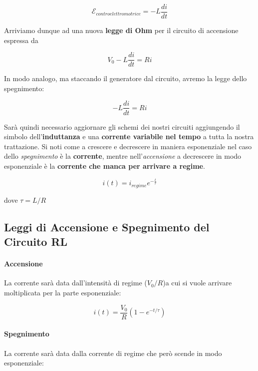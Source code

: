 $$ 
\mathcal{E}_{contro elettromotrice} = - L \frac{di}{dt}
$$

Arriviamo dunque ad una nuova \textbf{legge di Ohm} per il circuito di accensione espressa da
\begin{large}
	\begin{equation} \label{eq_Ohm_accensione}
		V_0 - L\frac{di}{dt} = Ri
	\end{equation}
\end{large}

In modo analogo, ma staccando il generatore dal circuito, avremo la legge dello spegnimento: 

\begin{large}
	\begin{equation} \label{eq_Ohm_spegnimento}
		-L\frac{di}{dt} = Ri
	\end{equation}
\end{large}

Sarà quindi necessario aggiornare gli schemi dei nostri circuiti aggiungendo il simbolo dell'\textbf{induttanza} e una \textbf{corrente variabile nel tempo} a tutta la nostra trattazione. Si noti come a crescere e decrescere in maniera esponenziale nel caso dello \textit{spegnimento} è la \textbf{corrente}, mentre nell'\textit{accensione} a decrescere in modo esponenziale è la \textbf{corrente che manca per arrivare a regime}.

\begin{large}
	\begin{equation}
		i(t) = i_{regime}e^{-\frac{t}{\tau}}
	\end{equation}
\end{large}

dove $\tau = L/R$

\subsection{Leggi di Accensione e Spegnimento del Circuito RL}

\paragraph{Accensione} La corrente sarà data dall'intensità di regime ($V_0/R$)a cui si vuole arrivare moltiplicata per la parte esponenziale: 

$$
i(t) = \frac{V_0}{R}\left(1 - e^{-t/\tau}\right)
$$

\paragraph{Spegnimento} La corrente sarà data dalla corrente di regime che però scende in modo esponenziale: 

